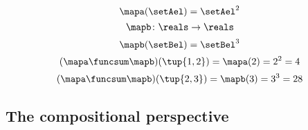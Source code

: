 \begin{forslides}
\begin{equation}
    \end{equation}
    \begin{equation}
        \label{eq:slides_session2_178}
        \mapa(\setAel)=\setAel^2
    \end{equation}
    \begin{equation}
        \label{eq:slides_session2_179}
        \mapb\colon \reals \to \reals
    \end{equation}
    \begin{equation}
        \label{eq:slides_session2_180}
        \mapb(\setBel)=\setBel^3
    \end{equation}
    \begin{equation}
        \label{eq:slides_session2_181}
        (\mapa \funcsum \mapb)(\tup{1,2})=\mapa(2)=2^2=4
    \end{equation}
    \begin{equation}
        \label{eq:slides_session2_182}
        (\mapa \funcsum \mapb)(\tup{2,3})=\mapb(3)=3^3 = 28
    \end{equation}

    \subsection{The compositional perspective}


\end{forslides}
